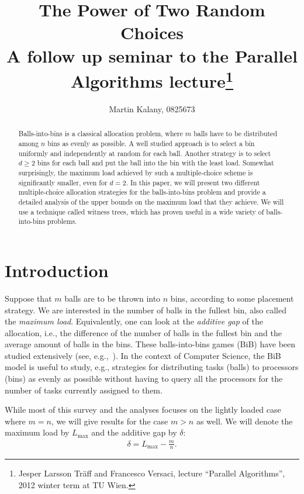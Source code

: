 \documentclass[a4paper,12pt]{article}
\newcommand\load{L_{\mathrm{max}}}
\begin{document}
\title{The Power of Two Random Choices\\ 
\large A follow up seminar to the Parallel Algorithms lecture\footnote{Jesper Larsson Tr\"aff and Francesco Versaci, lecture ``Parallel Algorithms'', 2012 winter term at TU Wien.}}
\author{Martin Kalany, 0825673}

\maketitle
\begin{abstract}
Balls-into-bins is a classical allocation problem, where $m$ balls have to be distributed among $n$ bins as evenly as possible. A well studied approach is to select a bin uniformly and independently at random for each ball. Another strategy is to select $d\geq 2$ bins for each ball and put the ball into the bin with the least load. Somewhat surprisingly, the maximum load achieved by such a multiple-choice scheme is significantly smaller, even for $d=2$. In this paper, we will present two different multiple-choice allocation strategies for the balls-into-bins problem and provide a detailed analysis of the upper bounds on the maximum load that they achieve. We will use a technique called witness trees, which has proven useful in a wide variety of balls-into-bins problems.
\end{abstract}

\section{Introduction}
\label{sec:intro}
Suppose that $m$ balls are to be thrown into $n$ bins, according to some placement strategy. We are interested in the number of balls in the fullest bin, also called the \emph{maximum load}. Equivalently, one can look at the \emph{additive gap} of the allocation, i.e., the difference of the number of balls in the fullest bin and the average amount of balls in the bins. These balls-into-bins games (BiB) have been studied extensively (see, e.g.,~\cite{JK77}). In the context of Computer Science, the BiB model is useful to study, e.g., strategies for distributing tasks (balls) to processors (bins) as evenly as possible without having to query all the processors for the number of tasks currently assigned to them.

While most of this survey and the analyses focuses on the lightly loaded case where $m=n$, we will give results for the case $m > n$ as well. We will denote the maximum load by $\load$ and the additive gap by $\delta$:
\begin{align*}
\delta = \load - \frac{m}{n}.
\end{align*}
\end{document}
